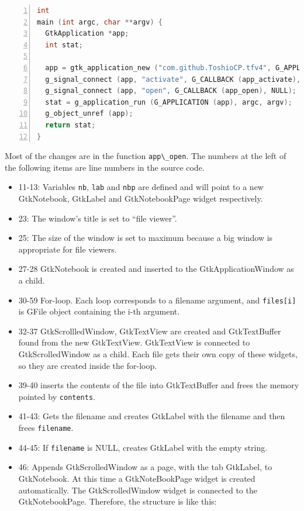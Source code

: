 \begin{lstlisting}[language=C, numbers=left]
int
main (int argc, char **argv) {
  GtkApplication *app;
  int stat;

  app = gtk_application_new ("com.github.ToshioCP.tfv4", G_APPLICATION_HANDLES_OPEN);
  g_signal_connect (app, "activate", G_CALLBACK (app_activate), NULL);
  g_signal_connect (app, "open", G_CALLBACK (app_open), NULL);
  stat = g_application_run (G_APPLICATION (app), argc, argv);
  g_object_unref (app);
  return stat;
}
\end{lstlisting}

Most of the changes are in the function
\passthrough{\lstinline!app\_open!}. The numbers at the left of the
following items are line numbers in the source code.

\begin{itemize}
\tightlist
\item
  11-13: Variables \passthrough{\lstinline!nb!},
  \passthrough{\lstinline!lab!} and \passthrough{\lstinline!nbp!} are
  defined and will point to a new GtkNotebook, GtkLabel and
  GtkNotebookPage widget respectively.
\item
  23: The window's title is set to ``file viewer''.
\item
  25: The size of the window is set to maximum because a big window is
  appropriate for file viewers.
\item
  27-28 GtkNotebook is created and inserted to the GtkApplicationWindow
  as a child.
\item
  30-59 For-loop. Each loop corresponds to a filename argument, and
  \passthrough{\lstinline!files[i]!} is GFile object containing the i-th
  argument.
\item
  32-37 GtkScrollledWindow, GtkTextView are created and GtkTextBuffer
  found from the new GtkTextView. GtkTextView is connected to
  GtkScrolledWindow as a child. Each file gets their own copy of these
  widgets, so they are created inside the for-loop.
\item
  39-40 inserts the contents of the file into GtkTextBuffer and frees
  the memory pointed by \passthrough{\lstinline!contents!}.
\item
  41-43: Gets the filename and creates GtkLabel with the filename and
  then frees \passthrough{\lstinline!filename!}.
\item
  44-45: If \passthrough{\lstinline!filename!} is NULL, creates GtkLabel
  with the empty string.
\item
  46: Appends GtkScrolledWindow as a page, with the tab GtkLabel, to
  GtkNotebook. At this time a GtkNoteBookPage widget is created
  automatically. The GtkScrolledWindow widget is connected to the
  GtkNotebookPage. Therefore, the structure is like this:
\end{itemize}

